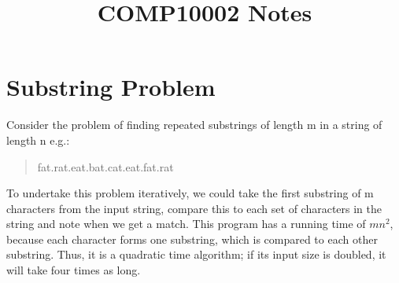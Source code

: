 \documentclass[12pt]{report}
\begin{document}
\title{COMP10002 Notes}
\chapter*{Substring Problem}
Consider the problem of finding repeated substrings of length m in a string of length n e.g.:
\begin{quotation}
\begin{center}
fat.rat.eat.bat.cat.eat.fat.rat
\end{center}
\end{quotation}
To undertake this problem iteratively, we could take the first substring of m characters from
the input string, compare this to each set of characters in the string and note when we get a match.
This program has a running time of \(mn^2\), because each character forms one substring, which is 
compared to each other substring. Thus, it is a quadratic time algorithm; if its input size is 
doubled, it will take four times as long.
\end{document}
